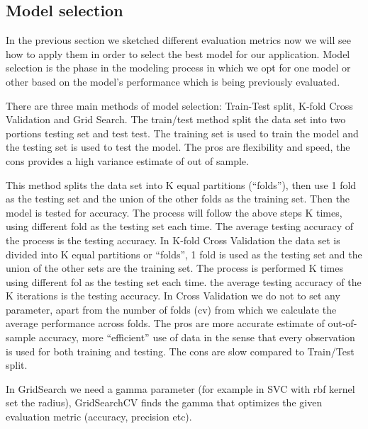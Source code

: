 \documentclass[11pt]{article}
\begin{document}
\subsection{Model selection}
In the previous section we sketched different evaluation metrics now we will see how to apply them in order to select the best model for our application. 
Model selection is the phase in the modeling process in which we opt for one model or other based on the model's performance which is being previously evaluated.

There are three main methods of model selection: Train-Test split, K-fold Cross Validation and Grid Search.
The train/test method split the data set into two portions testing set and test test. The training set is used to train the model and the testing set is used to test the model. The pros are flexibility and speed, the cons provides a high  variance estimate of out of sample. 

This method splits the data set into K equal partitions (“folds”), then use 1 fold as the testing set and the union of the other folds as the training set. Then the model is tested for accuracy. The process will follow the above steps K times, using different fold as the testing set each time. The average testing accuracy of the process is the testing accuracy.
In K-fold Cross Validation the data set is divided into K equal partitions or “folds”, 1 fold is used as the testing set and the union of the other sets are the training set. The process is performed K times using different fol as the testing set each time. the average testing accuracy of the K iterations is the testing accuracy.
In Cross Validation we do not to set any parameter, apart from the number of folds (cv) from which we calculate the average performance across folds. The pros are more accurate estimate of out-of-sample accuracy, more “efficient” use of data in the sense that every observation is used for both training and testing. The cons are slow compared to Train/Test split.

In GridSearch we need a gamma parameter (for example in SVC with rbf kernel set the radius), GridSearchCV finds the gamma that optimizes the given evaluation metric (accuracy, precision etc).
\end{document}
